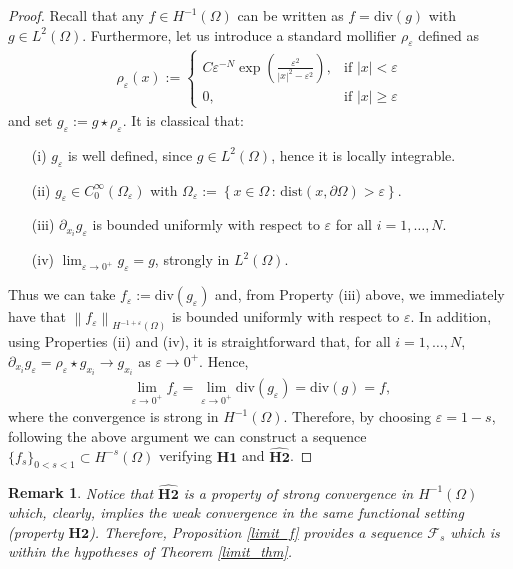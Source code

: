 \documentclass[reqno,twoside]{amsart}
\newtheorem{remark}[theorem]{Remark}
\numberwithin{equation}{section}
\newcommand{\norm}[2]{{\left\|#1\right\|}_{#2}}
\begin{document}
\begin{proof}
Recall that any $f\in H^{-1}(\Omega)$ can be written as $f=\textrm{div}(g)$ with $g\in L^2(\Omega)$. Furthermore, let us introduce a standard mollifier $\rho_\varepsilon$ defined as 
\begin{align*}
	\rho_\varepsilon(x):= \begin{cases}
	C\varepsilon^{-N}\exp\left(\frac{\varepsilon^2}{|x|^2-\varepsilon^2}\right), & \textrm{if } |x|<\varepsilon
	\\
	0, & \textrm{if } |x|\geq\varepsilon
	\end{cases}
\end{align*}
and set $g_\varepsilon:=g\star\rho_\varepsilon$. It is classical that:
\begin{itemize}
		\item[(i)] $g_\varepsilon$ is well defined, since $g\in L^2(\Omega)$, hence it is locally integrable.
		\item[(ii)] $g_\varepsilon\in C_0^\infty(\Omega_\varepsilon)$ with $\Omega_\varepsilon:=\left\{x\in\Omega\,:\, \textrm{dist}(x,\partial\Omega)>\varepsilon\right\}.$
		\item[(iii)] $\partial_{x_i}g_\varepsilon$ is bounded uniformly with respect to $\varepsilon$ for all $i=1,\ldots,N$.
		\item[(iv)] $\lim_{\varepsilon\to 0^+} g_\varepsilon = g$, strongly in $L^2(\Omega)$. 
\end{itemize}
	
Thus we can take $f_\varepsilon:=\textrm{div}(g_\varepsilon)$ and, from Property (iii) above, we immediately have that $\norm{f_\varepsilon}{H^{-1+\varepsilon}(\Omega)}$ is bounded uniformly with respect to $\varepsilon$. In addition, using Properties (ii) and (iv), it is straightforward that, for all $i=1,\ldots,N$, $\partial_{x_i} g_\varepsilon = \rho_\varepsilon\star g_{x_i} \to g_{x_i}$ as $\varepsilon\to 0^+$. Hence, 
\begin{align*}
	\lim_{\varepsilon\to 0^+}f_\varepsilon = \lim_{\varepsilon\to 0^+}\textrm{div}(g_\varepsilon) = \textrm{div}(g) = f,
\end{align*}
where the convergence is strong in $H^{-1}(\Omega)$. Therefore, by choosing $\varepsilon=1-s$, following the above argument we can construct a sequence $\{f_s\}_{0<s<1}\subset H^{-s}(\Omega)$ verifying $\textbf{H1}$ and $\widehat{\textbf{H2}}$.
\end{proof}

\begin{remark}
	Notice that $\widehat{\textbf{H2}}$ is a property of strong convergence in $H^{-1}(\Omega)$ which, clearly, implies the weak convergence in the same functional setting (property $\textbf{H2}$). Therefore, Proposition \ref{limit_f} provides a sequence $\mathcal{F}_s$ which is within the hypotheses of Theorem \ref{limit_thm}.
\end{remark}
\end{document}
